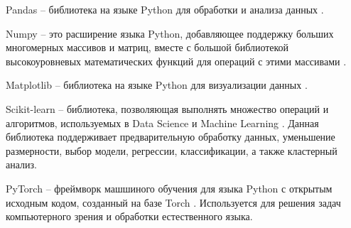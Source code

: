 Pandas -- библиотека на языке Python для обработки и анализа данных \cite{pandas}.

Numpy -- это расширение языка Python, добавляющее поддержку больших многомерных массивов и матриц, вместе с большой библиотекой высокоуровневых математических функций для операций с этими массивами \cite{numpy}.

Matplotlib -- библиотека на языке Python для визуализации данных \cite{matplotlib}.

Scikit-learn -- библиотека, позволяющая выполнять множество операций и алгоритмов, используемых в Data Science и Machine Learning \cite{sklearn}. Данная библиотека поддерживает предварительную обработку данных, уменьшение размерности, выбор модели, регрессии, классификации, а также кластерный анализ.

PyTorch -- фреймворк машшиного обучения для языка Python с открытым исходным кодом, созданный на базе Torch \cite{torch}. Используется для решения задач компьютерного зрения и обработки естественного языка.


\pagebreak